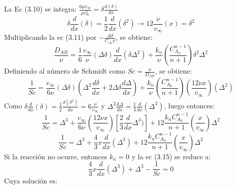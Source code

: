 La Ec (3.10) se integra: $\frac{6\mu v_\infty}{\rho v_\infty ^2}=\delta\frac{d(\delta)}{dx}$
\begin{equation}
    \delta \frac{d}{dx}(\delta)=\frac{1}{2}\frac{d}{dx}(\delta^2) \rightarrow12\frac{\nu}{v_\infty}(x)=\delta^2
\end{equation}
Multiplicando la ec (3.11) por $-\frac{\Delta \delta}{C_{A_0}\nu}$, se obtiene:
\begin{equation*}
    \frac{D_{AB}}{\nu}=\frac{1}{6}\frac{v_\infty}{\nu}(\Delta \delta)\frac{d}{dx}(\delta \Delta^2)+\frac{k_n}{\nu}(\frac{C_{A_0}^{n-1}}{n+1})\delta^2 \Delta^2
\end{equation*}
Definiendo al número de Schmidt como $Sc=\frac{\nu}{D_{AB}}$, se obtiene:
\begin{equation*}
    \frac{1}{Sc}=\frac{v_\infty}{6\nu}(\Delta \delta)(\Delta^2\frac{d\delta}{dx}+2\Delta \delta \frac{d\Delta}{dx})+\frac{k_n}{\nu}(\frac{C_{A_0}^{n-1}}{n+1})(\frac{12\nu x}{v_\infty})(\Delta^2)
\end{equation*}
Como $\delta \frac{d}{dx}(\delta)=\frac{1}{2}\frac{d(\delta^2)}{dx}=6\frac{\nu}{v_\infty}$ y $\Delta^2\frac{d\Delta}{dx}=\frac{1}{3}\frac{d}{dx}(\Delta^3)$, luego entonces:
\begin{equation*}
    \frac{1}{Sc}=\Delta^3+\frac{v_\infty}{6 \nu}(\frac{12\nu x}{v_\infty})[\frac{2}{3}\frac{d}{dx}\Delta^3)]+12\frac{k_nC_{A_0}^{n-1}}{n+1}(\frac{x}{v_\infty})\Delta^2
\end{equation*}
\begin{equation}
    \frac{1}{Sc}=\Delta^3+\frac{4}{3}x\frac{d}{dx}(\Delta^3)+12\frac{k_nC_{A_0}^{n-1}}{n+1}(\frac{x}{v_\infty})\Delta^2
\end{equation}
Si la reacción no ocurre, entonces $k_n=0$ y la ec (3.15) se reduce a:
\begin{equation}
    \frac{4}{3}x\frac{d}{dx}(\Delta^3)+\Delta^3-\frac{1}{Sc}=0
\end{equation}
Cuya solución es:

